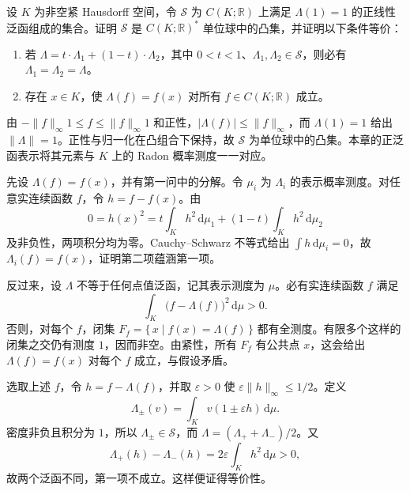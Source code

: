 \begin{optionalexercise}\label{b1:ex:11-extreme-states}
设 \(K\) 为非空紧 Hausdorff 空间，令 \(\mathcal S\) 为 \(C(K;\mathbb R)\) 上满足 \(\Lambda(1)=1\) 的正线性泛函组成的集合。证明 \(\mathcal S\) 是 \(C(K;\mathbb R)^*\) 单位球中的凸集，并证明以下条件等价：
\begin{enumerate}
\item\label{b1:item:11-state-extreme}
若 \(\Lambda=t\cdot \Lambda_1+(1-t)\cdot \Lambda_2\)，其中 \(0<t<1\)、\(\Lambda_1,\Lambda_2\in\mathcal S\)，则必有 \(\Lambda_1=\Lambda_2=\Lambda\)。
\item\label{b1:item:11-state-point}
存在 \(x\in K\)，使 \(\Lambda(f)=f(x)\) 对所有 \(f\in C(K;\mathbb R)\) 成立。
\end{enumerate}
\end{optionalexercise}
\begin{solution}
由 \(-\|f\|_\infty1\le f\le\|f\|_\infty1\) 和正性，\(|\Lambda(f)|\le\|f\|_\infty\)，而 \(\Lambda(1)=1\) 给出 \(\|\Lambda\|=1\)。正性与归一化在凸组合下保持，故 \(\mathcal S\) 为单位球中的凸集。本章的正泛函表示将其元素与 \(K\) 上的 Radon 概率测度一一对应。

先设 \(\Lambda(f)=f(x)\)，并有第一问中的分解。令 \(\mu_i\) 为 \(\Lambda_i\) 的表示概率测度。对任意实连续函数 \(f\)，令 \(h=f-f(x)\)。由
\[
 0=h(x)^2=t\int_Kh^2\,\mathrm d\mu_1
 +(1-t)\int_Kh^2\,\mathrm d\mu_2
\]
及非负性，两项积分均为零。Cauchy--Schwarz 不等式给出 \(\int h\,\mathrm d\mu_i=0\)，故 \(\Lambda_i(f)=f(x)\)，证明第二项蕴涵第一项。

反过来，设 \(\Lambda\) 不等于任何点值泛函，记其表示测度为 \(\mu\)。必有实连续函数 \(f\) 满足
\[
 \int_K\bigl(f-\Lambda(f)\bigr)^2\,\mathrm d\mu>0.
\]
否则，对每个 \(f\)，闭集 \(F_f=\{\,x\mid f(x)=\Lambda(f)\,\}\) 都有全测度。有限多个这样的闭集之交仍有测度 \(1\)，因而非空。由紧性，所有 \(F_f\) 有公共点 \(x\)，这会给出 \(\Lambda(f)=f(x)\) 对每个 \(f\) 成立，与假设矛盾。

选取上述 \(f\)，令 \(h=f-\Lambda(f)\)，并取 \(\varepsilon>0\) 使 \(\varepsilon\|h\|_\infty\le1/2\)。定义
\[
 \Lambda_\pm(v)=\int_Kv(1\pm\varepsilon h)\,\mathrm d\mu.
\]
密度非负且积分为 \(1\)，所以 \(\Lambda_\pm\in\mathcal S\)，而 \(\Lambda=(\Lambda_++\Lambda_-)/2\)。又
\[
 \Lambda_+(h)-\Lambda_-(h)
 =2\varepsilon\int_Kh^2\,\mathrm d\mu>0,
\]
故两个泛函不同，第一项不成立。这样便证得等价性。
\end{solution}

